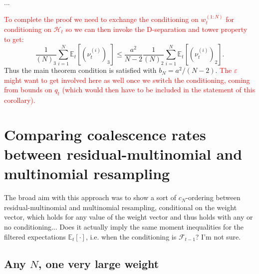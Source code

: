 \documentclass{article}
\newcommand{\Et}{\mathbb{E}_t}
\newcommand{\1}[1]{\mathbbm{1}_{#1}}
\newcommand{\seb}[1]{\xspace\textcolor{red}{#1}\xspace}
\begin{document}
...

\seb{To complete the proof we need to exchange the conditioning on $w_t^{(1:N)}$ for conditioning on $\mathcal{H}_t$ so we can then invoke the D-separation and tower property to get:}
\begin{equation*}
\frac{1}{(N)_3} \sum_{i=1}^N \Et [ (\nu_t^{(i)})_3 ]
\leq \frac{a^2}{N-2} \frac{1}{(N)_2} \sum_{i=1}^N \Et [ (\nu_t^{(i)})_2 ] .
\end{equation*}
Thus the main theorem condition is satisfied with $b_N = a^2/(N-2)$.
\seb{The $\varepsilon$ might want to get involved here as well once we switch the conditioning, coming from bounds on $q_t$ (which would then have to be included in the statement of this corollary).}




\section{Comparing coalescence rates between residual-multinomial and multinomial resampling}

The broad aim with this approach was to show a sort of $c_N$-ordering between residual-multinomial and multinomial resampling, conditional on the weight vector, which holds for any value of the weight vector and thus holds with any or no conditioning... Does it actually imply the same moment inequalities for the filtered expectations $\Et[\cdot]$, i.e. when the conditioning is $\mathcal{F}_{t-1}$? I'm not sure.\\

\subsection{Any $N$, one very large weight}
\end{document}
